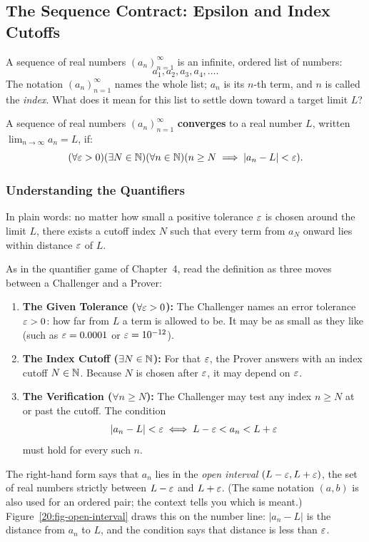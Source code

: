 \subsection{The Sequence Contract: Epsilon and Index Cutoffs}

A sequence of real numbers $(a_n)_{n=1}^\infty$ is an infinite, ordered list of numbers:
\[
a_1, a_2, a_3, a_4, \dots.
\]
The notation $(a_n)_{n=1}^\infty$ names the whole list; $a_n$ is its $n$-th term, and $n$ is called the \emph{index}.
What does it mean for this list to settle down toward a target limit $L$?

\begin{definition}
A sequence of real numbers $(a_n)_{n=1}^\infty$ \textbf{converges} to a real number $L$, written $\lim_{n \to \infty} a_n = L$, if:
\[
(\forall \varepsilon > 0)(\exists N \in \mathbb{N})(\forall n \in \mathbb{N})(n \ge N \implies |a_n - L| < \varepsilon).
\]
\end{definition}

\subsubsection{Understanding the Quantifiers}

In plain words: no matter how small a positive tolerance $\varepsilon$ is chosen around the limit $L$, there exists a cutoff index $N$ such that every term from $a_N$ onward lies within distance $\varepsilon$ of $L$.

As in the quantifier game of Chapter~4, read the definition as three moves between a Challenger and a Prover:
\begin{enumerate}[label=\arabic*.]
\item \textbf{The Given Tolerance ($\forall \varepsilon > 0$):} The Challenger names an error tolerance $\varepsilon > 0$: how far from $L$ a term is allowed to be. It may be as small as they like (such as $\varepsilon = 0.0001$ or $\varepsilon = 10^{-12}$).
\item \textbf{The Index Cutoff ($\exists N \in \mathbb{N}$):} For that $\varepsilon$, the Prover answers with an index cutoff $N \in \mathbb{N}$. Because $N$ is chosen after $\varepsilon$, it may depend on $\varepsilon$.
\item \textbf{The Verification ($\forall n \ge N$):} The Challenger may test any index $n \ge N$ at or past the cutoff. The condition
\[
|a_n - L| < \varepsilon \iff L - \varepsilon < a_n < L + \varepsilon
\]
must hold for every such $n$.
\end{enumerate}
The right-hand form says that $a_n$ lies in the \emph{open interval} $(L - \varepsilon, L + \varepsilon)$, the set of real numbers strictly between $L - \varepsilon$ and $L + \varepsilon$. (The same notation $(a, b)$ is also used for an ordered pair; the context tells you which is meant.) Figure~\ref{20:fig-open-interval} draws this on the number line: $|a_n - L|$ is the distance from $a_n$ to $L$, and the condition says that distance is less than $\varepsilon$.

